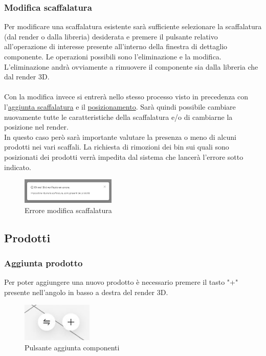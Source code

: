         \subsubsection{Modifica scaffalatura}\label{sec:scaffalature:modifica}
            Per modificare una scaffalatura esistente sarà sufficiente selezionare la scaffalatura (dal render o dalla libreria) desiderata e premere il pulsante relativo
            all'operazione di interesse presente all'interno della finestra di dettaglio componente. Le operazioni possibili sono l'eliminazione e la modifica. 
            L'eliminazione andrà ovviamente a rimuovere il componente sia dalla libreria che dal render 3D.\\ \\
            Con la modifica invece si entrerà nello stesso processo visto in precedenza con l'\hyperref[sec:scaffalature:aggiunta]{aggiunta scaffalatura} 
            e il \hyperref[sec:scaffalature:posizionamento]{posizionamento}. 
            Sarà quindi possibile cambiare nuovamente tutte le caratteristiche della scaffalatura e/o di cambiarne la posizione nel render.\\ 
            In questo caso però sarà importante valutare la presenza o meno di alcuni prodotti nei vari scaffali. La richiesta di rimozioni dei bin sui quali sono 
            posizionati dei prodotti verrà impedita dal sistema che lancerà l'errore sotto indicato. \\
            \begin{figure}[h!]
                \centering
                \includegraphics[width=0.4\textwidth]{images/errore_modifica.png}
                \caption{Errore modifica scaffalatura}
            \end{figure}





    \newpage            
    \subsection{Prodotti}\label{sec:prodotti}
        \subsubsection{Aggiunta prodotto}\label{sec:prodotti:aggiunta}
        Per poter aggiungere una nuovo prodotto è necessario premere il tasto "+" presente nell'angolo in basso a destra del render 3D.\\
        \begin{figure}[h!]
            \centering
            \includegraphics[width=0.3\textwidth]{images/aggiunta_spostamenti.png}
            \caption{Pulsante aggiunta componenti}
        \end{figure}
        
